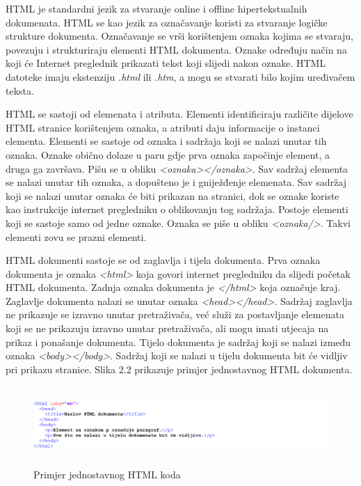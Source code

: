 \documentclass[times, utf8, zavrsni, numeric]{fer}
\begin{document}
HTML  je standardni jezik za stvaranje online i offline hipertekstualnih dokumenata. HTML se kao jezik za označavanje  koristi za stvaranje logičke strukture dokumenta. Označavanje se vrši korištenjem oznaka  kojima se stvaraju, povezuju i strukturiraju elementi HTML dokumenta. Oznake određuju način na koji će Internet preglednik prikazati tekst koji slijedi nakon oznake. HTML datoteke imaju ekstenziju \emph{.html} ili \emph{.htm}, a mogu se stvarati bilo kojim uređivačem teksta.

HTML se sastoji od elemenata i atributa. Elementi identificiraju različite dijelove HTML stranice korištenjem oznaka, a atributi daju informacije o instanci elementa. Elementi se sastoje od oznaka i sadržaja koji se nalazi unutar tih oznaka. Oznake obično dolaze u paru gdje prva oznaka započinje element, a druga ga završava. Pišu se u obliku \emph{<oznaka></oznaka>}. Sav sadržaj elementa se nalazi unutar tih oznaka, a dopušteno je i gniježđenje elemenata. Sav sadržaj koji se nalazi unutar oznaka će biti prikazan na stranici, dok se oznake koriste kao instrukcije internet pregledniku o oblikovanju tog sadržaja. Postoje elementi koji se sastoje samo od jedne oznake. Oznaka se piše u obliku \emph{<oznaka/>}. Takvi elementi zovu se prazni elementi.

HTML dokumenti sastoje se od zaglavlja i tijela dokumenta. Prva oznaka dokumenta je oznaka \emph{<html>} koja govori internet pregledniku da slijedi početak HTML dokumenta. Zadnja oznaka dokumenta je  \emph{</html>} koja označuje kraj. Zaglavlje dokumenta nalazi se unutar oznaka  \emph{<head></head>}. Sadržaj zaglavlja ne prikazuje se izravno unutar pretraživača, već služi za postavljanje elemenata koji se ne prikazuju izravno unutar pretraživača, ali mogu imati utjecaja na prikaz i ponašanje dokumenta. Tijelo dokumenta je sadržaj koji se nalazi između oznaka \emph{<body></body>}. Sadržaj koji se nalazi u tijelu dokumenta bit će vidljiv pri prikazu stranice. Slika 2.2 prikazuje primjer jednostavnog HTML dokumenta.
\begin{figure}[htb]
\centering
\includegraphics[height=3cm]{basichtml.png}
\caption{Primjer jednostavnog HTML koda}
\label{fig:basichtml}
\end{figure}
\end{document}
